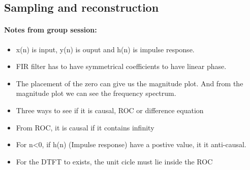 \documentclass{article}
\begin{document}
\subsection{Sampling and reconstruction}

\paragraph{Notes from group session:}
\begin{itemize}
    \item x(n) is input, y(n) is ouput and h(n) is impulse response. 
    \item FIR filter has to have symmetrical coefficients to have linear phase.
    \item The placement of the zero can give us the magnitude plot. And from the magnitude plot we can see the frequency spectrum. 
    \item Three ways to see if it is causal, ROC or difference equation
    \item From ROC, it is causal if it contains infinity
    \item For n<0, if h(n) (Impulse response) have a postive value, it it anti-causal.
    \item For the DTFT to exists, the unit cicle must lie inside the ROC
\end{itemize}
\end{document}
